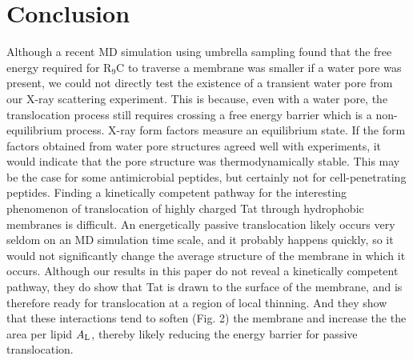 \section{Conclusion}\label{sec:conclusion}
Although a recent MD simulation using umbrella sampling \cite{Huang13} found 
that the free energy required for R$_9$C to traverse a membrane was smaller 
if a water pore was present, we could not directly test the existence of a 
transient water pore from our X-ray scattering experiment. 
This is because, even with a water pore, the translocation process still 
requires crossing a free energy barrier which is a non-equilibrium process. 
X-ray form factors measure an equilibrium state. If the form factors obtained 
from water pore structures agreed well with experiments, it would indicate 
that the pore structure was thermodynamically stable. This may be the case for 
some antimicrobial peptides, but certainly not for cell-penetrating peptides.
Finding a kinetically competent pathway for the interesting phenomenon of 
translocation of highly charged Tat through hydrophobic membranes is difficult. 
An energetically passive translocation likely occurs very seldom on an MD 
simulation time scale, and it probably happens quickly, so it would not 
significantly change the average structure of the membrane in which it occurs. 
Although our results in this paper do not reveal a kinetically competent 
pathway, they do show that Tat is drawn to the surface of the membrane, and is 
therefore ready for translocation at a region of local thinning. And they show 
that these interactions tend to soften (Fig. 2) the membrane and increase the 
the area per lipid $A_\textrm{L}$, thereby likely reducing the energy barrier for 
passive translocation.
